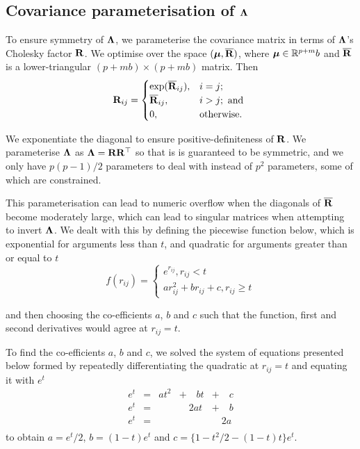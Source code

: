 \subsection{Covariance parameterisation of ${\boldsymbol \Lambda}$}
To ensure symmetry of ${\boldsymbol \Lambda}$, we parameterise the covariance matrix in
terms of ${\boldsymbol \Lambda}$'s Cholesky factor  ${\bf R}$. We optimise
over the space $({\boldsymbol \mu}, \overline{{\bf R}})$, where ${\boldsymbol \mu} \in {\mathbb{R}}^{p + m}b$ and
$\overline{{\bf R}}$ is a lower-triangular $(p + mb) \times (p + mb)$ matrix. Then
\begin{equation*}
	{\bf R}_{ij} =
	\begin{cases}
		\exp(\overline{{\bf R}}_{ij}), & i = j;\\
		\overline{{\bf R}}_{ij},       & i > j; \text{ and }\\
		0,                         & \text{otherwise}. 
	\end{cases}
\end{equation*}
		
\noindent We exponentiate the diagonal to ensure positive-definiteness of
${\bf R}$. We parameterise ${\boldsymbol \Lambda}$ as ${\boldsymbol \Lambda} = {\bf R} {\bf R}^\top$ so that is is
guaranteed to be symmetric, and we only have $p(p-1)/2$ parameters to deal with
instead of $p^2$ parameters, some of which are constrained. 

This parameterisation can lead to numeric overflow when the diagonals of
$\overline{{\bf R}}$ become moderately large, which can lead to singular matrices
when attempting to invert ${\boldsymbol \Lambda}$. We dealt with this by defining the
piecewise function below, which is exponential for arguments less than $t$, and
quadratic for arguments greater than or equal to $t$
\begin{equation}
\label{eq:piecewise_function}
f(r_{ij}) =
\begin{cases}
	e^{r_{ij}}, r_{ij} < t                   \\
	a r_{ij}^2 + b r_{ij} + c, r_{ij} \geq t 
\end{cases}
\end{equation}

\noindent and then choosing the co-efficients $a$, $b$ and $c$ such that the
function, first and second derivatives would agree at $r_{ij} = t$.

To find the co-efficients $a$, $b$ and $c$, we solved the system of equations
presented below formed by repeatedly  differentiating the quadratic at $r_{ij}
=  t$ and equating it with $e^t$
\begin{equation}
\label{eq:system_of_equations}
\begin{array}{lllll}
	e^t & = & a t^2 & + \quad b t & + \quad c \\
	e^t & = &       & \quad 2a t  & + \quad b \\
	e^t & = &       &             & \quad 2a  \\
\end{array}
\end{equation}
\noindent to obtain $a = e^t / 2$, $b = (1 - t) e^t$ and $c = \{1 - t^2/2 - (1 - t) t\} e^t$.

